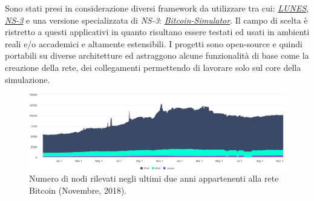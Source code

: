 Sono stati presi in considerazione diversi framework da utilizzare tra cui: \href{http://pads.cs.unibo.it/doku.php?id=pads:lunes}{\textit{LUNES}}, \href{https://www.nsnam.org/}{\textit{NS-3}} e una versione specializzata di \textit{NS-3}: \href{https://github.com/arthurgervais/Bitcoin-Simulator}{\textit{Bitcoin-Simulator}}. Il campo di scelta è ristretto a questi applicativi in quanto risultano essere testati ed usati in ambienti reali e/o accademici e altamente estensibili. I progetti sono open-source e quindi portabili su diverse architetture ed astraggono alcune funzionalità di base come la creazione della rete, dei collegamenti permettendo di lavorare solo sul core della simulazione.
\begin{figure}
    \includegraphics[width=\textwidth]{images/number_nodes.png}
    \caption{Numero di nodi rilevati negli ultimi due anni appartenenti alla rete Bitcoin (Novembre, 2018).}
\end{figure}

